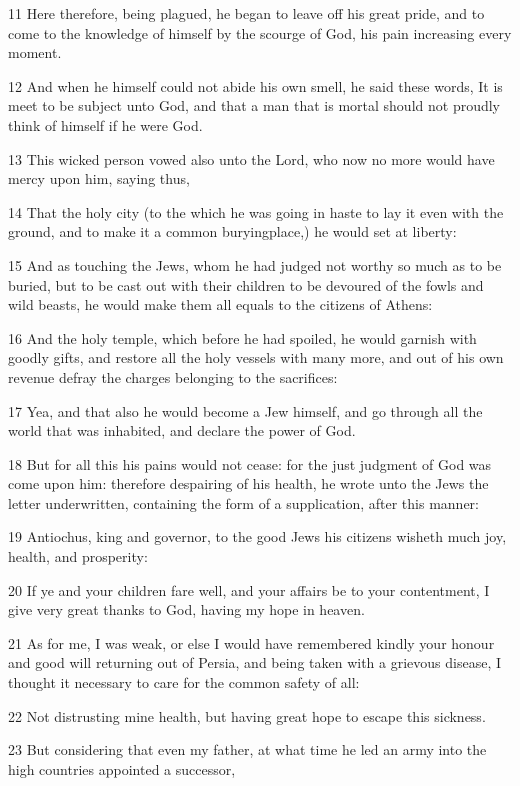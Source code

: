 \par 11 Here therefore, being plagued, he began to leave off his great pride, and to come to the knowledge of himself by the scourge of God, his pain increasing every moment.
\par 12 And when he himself could not abide his own smell, he said these words, It is meet to be subject unto God, and that a man that is mortal should not proudly think of himself if he were God.
\par 13 This wicked person vowed also unto the Lord, who now no more would have mercy upon him, saying thus,
\par 14 That the holy city (to the which he was going in haste to lay it even with the ground, and to make it a common buryingplace,) he would set at liberty:
\par 15 And as touching the Jews, whom he had judged not worthy so much as to be buried, but to be cast out with their children to be devoured of the fowls and wild beasts, he would make them all equals to the citizens of Athens:
\par 16 And the holy temple, which before he had spoiled, he would garnish with goodly gifts, and restore all the holy vessels with many more, and out of his own revenue defray the charges belonging to the sacrifices:
\par 17 Yea, and that also he would become a Jew himself, and go through all the world that was inhabited, and declare the power of God.
\par 18 But for all this his pains would not cease: for the just judgment of God was come upon him: therefore despairing of his health, he wrote unto the Jews the letter underwritten, containing the form of a supplication, after this manner:
\par 19 Antiochus, king and governor, to the good Jews his citizens wisheth much joy, health, and prosperity:
\par 20 If ye and your children fare well, and your affairs be to your contentment, I give very great thanks to God, having my hope in heaven.
\par 21 As for me, I was weak, or else I would have remembered kindly your honour and good will returning out of Persia, and being taken with a grievous disease, I thought it necessary to care for the common safety of all:
\par 22 Not distrusting mine health, but having great hope to escape this sickness.
\par 23 But considering that even my father, at what time he led an army into the high countries appointed a successor,
